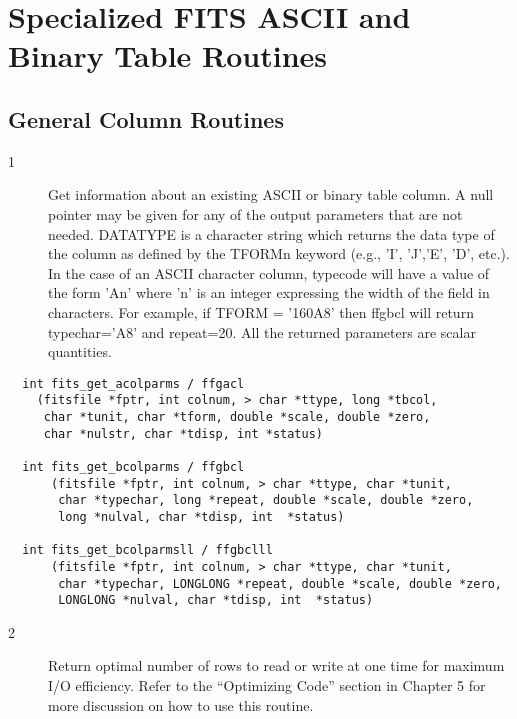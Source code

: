 \documentclass[11pt]{book}
\begin{document}
\section{Specialized FITS ASCII and Binary Table Routines}


\subsection{General Column Routines}


\begin{description}
\item[1 ] Get information about an existing ASCII or binary table column.   A null
    pointer may be given for any of the output parameters that are not
    needed.  DATATYPE is a character string which returns the data type
    of the column as defined by the TFORMn keyword (e.g., 'I', 'J','E',
    'D', etc.).  In the case of an ASCII character column, typecode
    will have a value of the form 'An' where 'n' is an integer
    expressing the width of the field in characters.  For example, if
    TFORM = '160A8' then ffgbcl will return typechar='A8' and
    repeat=20.   All the returned parameters are scalar quantities.
   \label{ffgacl} \label{ffgbcl}
\end{description}

\begin{verbatim}
  int fits_get_acolparms / ffgacl
    (fitsfile *fptr, int colnum, > char *ttype, long *tbcol,
     char *tunit, char *tform, double *scale, double *zero,
     char *nulstr, char *tdisp, int *status)

  int fits_get_bcolparms / ffgbcl
      (fitsfile *fptr, int colnum, > char *ttype, char *tunit,
       char *typechar, long *repeat, double *scale, double *zero,
       long *nulval, char *tdisp, int  *status)

  int fits_get_bcolparmsll / ffgbclll
      (fitsfile *fptr, int colnum, > char *ttype, char *tunit,
       char *typechar, LONGLONG *repeat, double *scale, double *zero,
       LONGLONG *nulval, char *tdisp, int  *status)
\end{verbatim}

\begin{description}
\item[2 ] Return optimal number of rows to read or write at one time for
    maximum I/O efficiency.  Refer to the
    ``Optimizing Code'' section in Chapter 5 for more discussion on how
   to use this routine. \label{ffgrsz}
\end{description}
\end{document}
